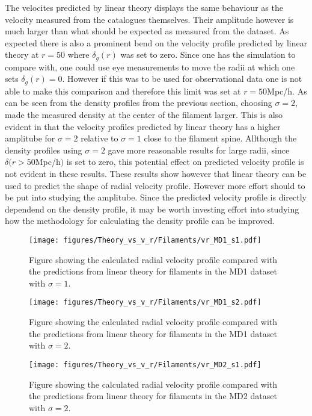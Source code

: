 The velocites predicted by linear theory displays the same behaviour as the velocity measured from the catalogues themselves. Their amplitude however is much larger than what should be expected as measured from the dataset. As expected there is also a prominent bend on the velocity profile predicted by linear theory at $r=50$ where $\delta_g(r)$ was set to zero. Since one has the simulation to compare with, one could use eye measurements to move the radii at which one sets $\delta_g(r)=0$. However if this was to be used for observational data one is not able to make this comparison and therefore this limit was set at $r=50$Mpc/h. As can be seen from the density profiles from the previous section, choosing $\sigma=2$, made the measured density at the center of the filament larger. This is also evident in that the velocity profiles predicted by linear theory has a higher amplitube for $\sigma=2$ relative to $\sigma=1$ close to the filament spine. Allthough the density profiles using $\sigma=2$ gave more reasonable results for large radii, since $\delta(r>50$Mpc/h$)$ is set to zero, this potential effect on predicted velocity profile is not evident in these results. These results show however that linear theory can be used to predict the shape of radial velocity profile. However more effort should to be put into studying the amplitube. Since the predicted velocity profile is directly dependend on the density profile, it may be worth investing effort into studying how the methodology for calculating the density profile can be improved. 


\begin{figure}[htbp]
    \texttt{[image: figures/Theory\_vs\_v\_r/Filaments/vr\_MD1\_s1.pdf]}
    \caption{Figure showing the calculated radial velocity profile compared with the predictions from linear theory for filaments in the MD1 dataset with $\sigma=1$.}
    \label{fig:filvrMD1s1}
\end{figure}

\begin{figure}[htbp]
    \texttt{[image: figures/Theory\_vs\_v\_r/Filaments/vr\_MD1\_s2.pdf]}
    \caption{Figure showing the calculated radial velocity profile compared with the predictions from linear theory for filaments in the MD1 dataset with $\sigma=2$.}
    \label{fig:filvrMD1s2}
\end{figure}

\begin{figure}[htbp]
    \texttt{[image: figures/Theory\_vs\_v\_r/Filaments/vr\_MD2\_s1.pdf]}
    \caption{Figure showing the calculated radial velocity profile compared with the predictions from linear theory for filaments in the MD2 dataset with $\sigma=2$.}
    \label{fig:filvrMD2s1}
\end{figure}

